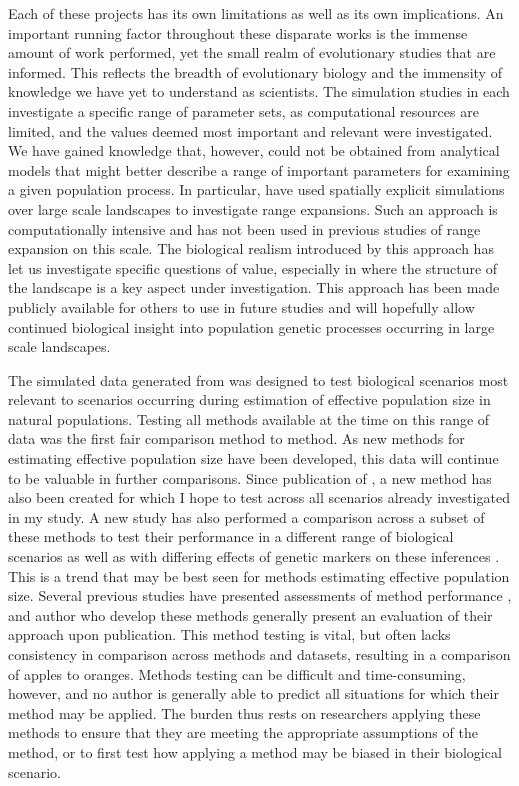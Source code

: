 Each of these projects has its own limitations as well as its own implications. An important running factor throughout these disparate works is the immense amount of work performed, yet the small realm of evolutionary studies that are informed. This reflects the breadth of evolutionary biology and the immensity of knowledge we have yet to understand as scientists. The simulation studies in  each investigate a specific range of parameter sets, as computational resources are limited, and the values deemed most important and relevant were investigated. We have gained knowledge that, however, could not be obtained from analytical models that might better describe a range of important parameters for examining a given population process. In particular,  have used spatially explicit simulations over large scale landscapes to investigate range expansions. Such an approach is computationally intensive and has not been used in previous studies of range expansion on this scale. The biological realism introduced by this approach has let us investigate specific questions of value, especially in  where the structure of the landscape is a key aspect under investigation. This approach has been made publicly available for others to use in future studies and will hopefully allow continued biological insight into population genetic processes occurring in large scale landscapes.

The simulated data generated from  was designed to test biological scenarios most relevant to scenarios occurring during estimation of effective population size in natural populations. Testing all methods available at the time on this range of data was the first fair comparison method to method. As new methods for estimating effective population size have been developed, this data will continue to be valuable in further comparisons. Since publication of , a new method \citep{Hui:2015} has also been created for which I hope to test across all scenarios already investigated in my study. A new study has also performed a comparison across a subset of these methods to test their performance in a different range of biological scenarios as well as with differing effects of genetic markers on these inferences \citep{Wang:2016}. This is a trend that may be best seen for methods estimating effective population size. Several previous studies have presented assessments of method performance \citep{Ryman:2013, Neel:2013, Holleley:2013, Hoehn:2012, Barker:2011}, and author who develop these methods generally present an evaluation of their approach upon publication. This method testing is vital, but often lacks consistency in comparison across methods and datasets, resulting in a comparison of apples to oranges. Methods testing can be difficult and time-consuming, however, and no author is generally able to predict all situations for which their method may be applied. The burden thus rests on researchers applying these methods to ensure that they are meeting the appropriate assumptions of the method, or to first test how applying a method may be biased in their biological scenario.

